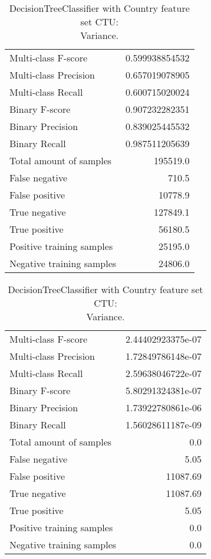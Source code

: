 \begin{table}[H]
\begin{minipage}{0.5\textwidth}
\caption{DecisionTreeClassifier with Country feature set CTU: \\Average.}
\centering
\begin{tabular}{l r}
\toprule
Multi-class F-score & 0.599938854532 \\
Multi-class Precision & 0.657019078905 \\
Multi-class Recall & 0.600715020024 \\
\midrule
Binary F-score & 0.907232282351 \\
Binary Precision & 0.839025445532 \\
Binary Recall & 0.987511205639 \\
\midrule
Total amount of samples & 195519.0 \\
False negative & 710.5 \\
False positive & 10778.9 \\
True negative & 127849.1 \\
True positive & 56180.5 \\
\midrule
Positive training samples & 25195.0 \\
Negative training samples & 24806.0 \\
\bottomrule
\end{tabular}
\end{minipage}
\hfillx
\begin{minipage}{0.5\textwidth}
\caption{DecisionTreeClassifier with Country feature set CTU: \\Variance.}
\centering
\begin{tabular}{l r}
\toprule
Multi-class F-score & 2.44402923375e-07 \\
Multi-class Precision & 1.72849786148e-07 \\
Multi-class Recall & 2.59638046722e-07 \\
\midrule
Binary F-score & 5.80291324381e-07 \\
Binary Precision & 1.73922780861e-06 \\
Binary Recall & 1.56028611187e-09 \\
\midrule
Total amount of samples & 0.0 \\
False negative & 5.05 \\
False positive & 11087.69 \\
True negative & 11087.69 \\
True positive & 5.05 \\
\midrule
Positive training samples & 0.0 \\
Negative training samples & 0.0 \\
\bottomrule
\end{tabular}
\end{minipage}
\end{table}

